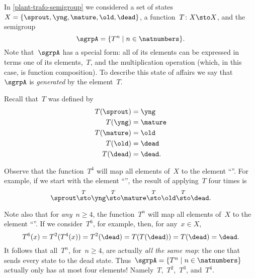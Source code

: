 
\clearmargin


\section{}


In \cref{plant-trafo-semigroup} we considered a set of states~$X = \{ \sprout, \yng, \mature, \old, \dead \}$, a function~$T\colon X \sto X$, and the semigroup
%
\begin{equation}
  \label{eq:trafo-sgrp-one-gen}
  \sgrpA = \{ T^n \mid n \in \natnumbers \}.
\end{equation}
%
Note that~$\sgrpA$ has a special form: all of its elements can be expressed in terms one of its elements,~$T$, and the multiplication operation (which, in this case, is function composition).
To describe this state of affairs we say that~$\sgrpA$ is \emph{generated} by the element~$T$.


Recall that~$T$ was defined by
%
\begin{align*}
  T(\sprout) &=  \yng \\
  T(\yng) &=  \mature \\
  T(\mature) &=  \old \\
  T( \old) &= \dead \\
  T (\dead) &= \dead.
\end{align*}

Observe that the function~$T^4$ will map all elements of~$X$ to the element ``\dead''. For example, if we start with the element ``\sprout'', the result of applying~$T$ four times is
%
\begin{equation*}
  \sprout \overset{T}{\sto} \yng \overset{T}{\sto} \mature \overset{T}{\sto} \old \overset{T}{\sto} \dead.
\end{equation*}

Note also that for \emph{any}~$n \geq 4$, the function~$T^n$ will map all elements of~$X$ to the element ``\dead''.
If we consider~$T^6$, for example, then, for any~$x \in X$,
\begin{equation*}
  T^6(x) = T^2(T^4(x)) = T^2(\dead) = T(T(\dead)) = T(\dead) = \dead.
\end{equation*}
It follows that all~$T^n$, for~$n \geq 4$, are actually \emph{all the same map}: the one that sends every state to the dead state.
Thus~$\sgrpA = \{ T^n \mid n \in \natnumbers \}$ actually only has at most four elements! Namely~$T$,~$T^2$,~$T^3$, and~$T^4$.

